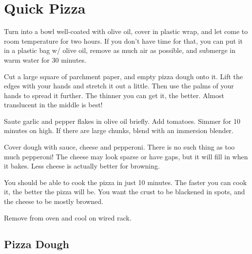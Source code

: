 \section{Quick Pizza}
\begin{recipe}


Turn into a bowl well-coated with olive oil, cover in plastic wrap, and let
come to room temperature for two hours. If you don't have time for that, you
can put it in a plastic bag w/ olive oil, remove as much air as possible, and
submerge in warm water for 30 minutes.

Cut a large square of parchment paper, and empty pizza dough onto it. Lift the
edges with your hands and stretch it out a little. Then use the palms of your
hands to spread it further. The thinner you can get it, the better. Almost
translucent in the middle is best!


Saute garlic and pepper flakes in olive oil briefly. Add tomatoes. Simmer for 10 minutes on high.
If there are large chunks, blend with an immersion blender.


Cover dough with sauce, cheese and pepperoni. There is no such thing as too much
pepperoni! The cheese may look sparse or have gaps, but it will fill in when it
bakes. Less cheese is actually better for browning.

You should be able to cook the pizza in just 10 minutes.
The faster you can cook it, the better the pizza will be.
You want the crust to be blackened in spots, and the cheese
to be mostly browned.

Remove from oven and cool on wired rack.

\subsection{Pizza Dough}


\end{recipe}
